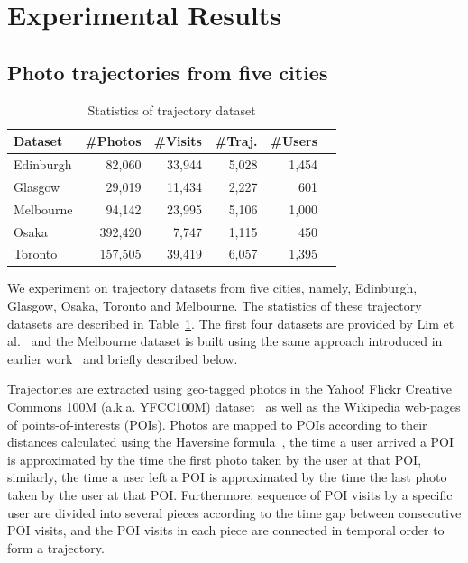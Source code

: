 
\section{Experimental Results}
\label{sec:experiment}
\secmoveup

\subsection{Photo trajectories from five cities}
\label{sec:dataset}
\secmoveup

\begin{table}
\caption{Statistics of trajectory dataset}
\label{tab:data}
\centering
\begin{tabular}{l*{5}{r}} \hline
\textbf{Dataset} & \textbf{\#Photos} & \textbf{\#Visits} & \textbf{\#Traj.} & \textbf{\#Users} \\ \hline
Edinburgh & 82,060 & 33,944 & 5,028 & 1,454 \\
Glasgow & 29,019 & 11,434 & 2,227 & 601 \\
Melbourne & 94,142 & 23,995 & 5,106 & 1,000 \\
Osaka & 392,420 & 7,747 & 1,115 & 450 \\
Toronto & 157,505 & 39,419 & 6,057 & 1,395 \\
\hline
\end{tabular}\captionmoveup
\end{table}


We experiment on trajectory datasets from five cities, namely, Edinburgh, Glasgow, Osaka, Toronto and Melbourne.
The statistics of these trajectory datasets are described in Table~\ref{tab:data}.
The first four datasets are provided by Lim et al.~\cite{ijcai15} and the Melbourne dataset is built using
the same approach introduced in earlier work~\cite{ht10, ijcai15} and briefly described below.

Trajectories are extracted using  geo-tagged photos in the Yahoo! Flickr Creative Commons 100M
(a.k.a. YFCC100M) dataset~\cite{thomee2016yfcc100m} as well as the Wikipedia web-pages of points-of-interests (POIs).
Photos are mapped to POIs according to their distances calculated using the Haversine formula~\cite{haversine},
the time a user arrived a POI is approximated by the time the first photo taken by the user at that POI,
similarly, the time a user left a POI is approximated by the time the last photo taken 
by the user at that POI. 
Furthermore, sequence of POI visits by a specific user are divided into several pieces according to
the time gap between consecutive POI visits, and the POI visits in each piece are connected in temporal order
to form a trajectory. 


